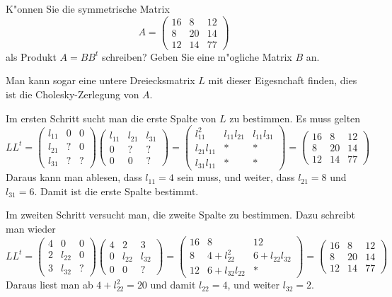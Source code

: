 K"onnen Sie die symmetrische Matrix
\[
A=\begin{pmatrix}
16& 8&12\\
 8&20&14\\
12&14&77
\end{pmatrix}
\]
als Produkt $A=BB^t$ schreiben? Geben Sie eine m"ogliche Matrix $B$ an.

\begin{loesung}
Man kann sogar eine untere Dreiecksmatrix $L$ mit dieser Eigesnchaft finden,
dies ist die Cholesky-Zerlegung von $A$.

Im ersten Schritt sucht man die erste Spalte von $L$ zu bestimmen.
Es muss gelten
\[
LL^t=
\begin{pmatrix}
l_{11}&  0&  0\\
l_{21}&  ?&  0\\
l_{31}&  ?&  ?
\end{pmatrix}
\begin{pmatrix}
l_{11}&l_{21}&l_{31}\\
     0&     ?&     ?\\
     0&     0&     ?
\end{pmatrix}
=
\begin{pmatrix}
    l_{11}^2&l_{11}l_{21}&l_{11}l_{31}\\
l_{21}l_{11}&           *&           *\\
l_{31}l_{11}&           *&           *
\end{pmatrix}
=
\begin{pmatrix}
16& 8& 12\\
 8&20& 14\\
12&14& 77
\end{pmatrix}
\]
Daraus kann man ablesen, dass $l_{11}=4$ sein muss, und weiter,
dass
$l_{21}=8$ und $l_{31}=6$. Damit ist die erste Spalte bestimmt.

Im zweiten Schritt versucht man, die zweite Spalte zu bestimmen.
Dazu schreibt man wieder
\[
LL^t
=
\begin{pmatrix}
4&     0&0\\
2&l_{22}&0\\
3&l_{32}&?
\end{pmatrix}
\begin{pmatrix}
4&     2&     3\\
0&l_{22}&l_{32}\\
0&     0&?
\end{pmatrix}
=
\begin{pmatrix}
16&              8&            12\\
 8& 4+l_{22}^2    &6+l_{22}l_{32}\\
12& 6+l_{32}l_{22}&             *
\end{pmatrix}
=
\begin{pmatrix}
16& 8& 12\\
 8&20& 14\\
12&14& 77
\end{pmatrix}
\]
Daraus liest man ab $4+l_{22}^2=20$ und damit $l_{22}=4$, und weiter
$l_{32}=2$.


\end{loesung}
